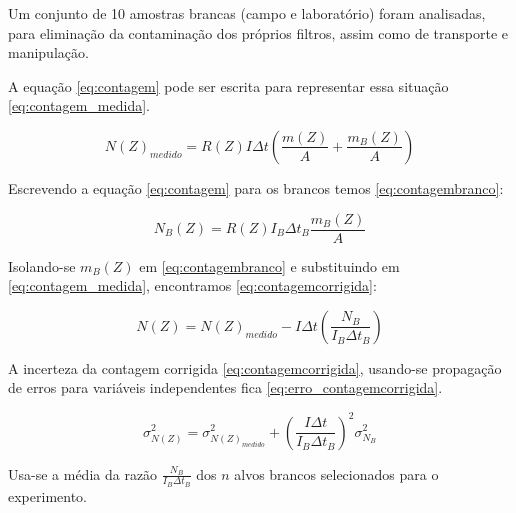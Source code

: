 Um conjunto de 10 amostras brancas (campo e laboratório) foram analisadas, 
para eliminação da contaminação dos próprios filtros, assim como de 
transporte e manipulação.

A equação \ref{eq:contagem} pode ser escrita para representar essa situação
\ref{eq:contagem_medida}. 

\begin{equation}
  \label{eq:contagem_medida}
  N(Z)_{medido} = R(Z) I\Delta t \left( \frac{m(Z)}{A} + \frac{m_B(Z)}{A} \right)
\end{equation}  

Escrevendo a equação \ref{eq:contagem} para os brancos temos \ref{eq:contagembranco}:

\begin{equation}
  \label{eq:contagembranco}
  N_B(Z) = R(Z) I_B\Delta t_B \frac{m_B(Z)}{A}
\end{equation}

Isolando-se $m_B(Z)$ em \ref{eq:contagembranco} e substituindo em 
\ref{eq:contagem_medida}, encontramos \ref{eq:contagemcorrigida}:
 
\begin{equation}
  \label{eq:contagemcorrigida}
  N(Z) = N(Z)_{medido} - I\Delta t \left( \frac{N_B}{I_B \Delta t_B} \right)
\end{equation}


A incerteza da contagem corrigida \ref{eq:contagemcorrigida}, 
usando-se propagação de erros para variáveis independentes fica
\ref{eq:erro_contagemcorrigida}.

\begin{equation}
  \label{eq:erro_contagemcorrigida}
  \sigma_{N(Z)}^2 = \sigma_{N(Z)_{medido}}^2 + \left( \frac{I \Delta t}{I_B \Delta t_B} \right)^2 \sigma_{N_B}^2
\end{equation}

Usa-se a média da razão $\frac{N_B}{I_B \Delta t_B}$ dos $n$ alvos brancos
selecionados para o experimento. 




